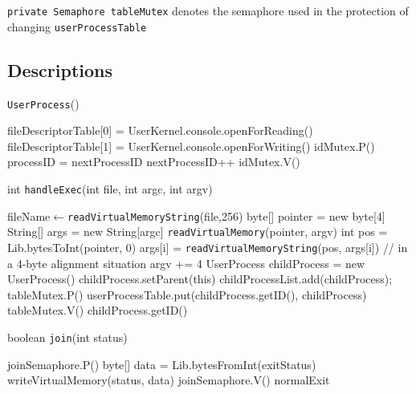\documentclass{article}
\newcommand{\eq}{$\leftarrow$}
\begin{document}
\begin{spacing}{1.1}
\texttt{private Semaphore tableMutex} denotes the semaphore used in the protection of changing \texttt{userProcessTable}
\subsection{Descriptions}
\begin{algorithm}
\caption{\texttt{UserProcess}()}
  \begin{algorithmic}
    \STATE fileDescriptorTable[0] = UserKernel.console.openForReading()
    \STATE fileDescriptorTable[1] = UserKernel.console.openForWriting()
    \STATE \colorbox{myyellow}{idMutex.P()}
	\STATE processID = nextProcessID
	\STATE nextProcessID++
	\STATE \colorbox{myyellow}{idMutex.V()}
  \end{algorithmic}
\end{algorithm}

\begin{algorithm}
\caption{int \texttt{handleExec}(int file, int argc, int argv)}
  \begin{algorithmic}
    \STATE fileName\eq\texttt{readVirtualMemoryString}(file,256)
    \ENDIF
    \ENDIF
      \STATE byte[] pointer = new byte[4]
      \STATE String[] args = new String[argc]
        \STATE \texttt{readVirtualMemory}(pointer, argv)
        \STATE int pos = Lib.bytesToInt(pointer, 0)
        \STATE args[i] = \texttt{readVirtualMemoryString}(pos, args[i])
        \STATE \colorbox{myyellow}{// in a 4-byte alignment situation}
        \STATE argv += 4
        \ENDFOR
    \STATE UserProcess childProcess = new UserProcess()
    \ENDIF
    \STATE childProcess.setParent(this)
    \STATE childProcessList.add(childProcess);
    \STATE \colorbox{myyellow}{tableMutex.P()}
    \STATE userProcessTable.put(childProcess.getID(), childProcess)
    \STATE \colorbox{myyellow}{tableMutex.V()}
    \ENDIF
    \RETURN childProcess.getID()
  \end{algorithmic}
\end{algorithm}

\begin{algorithm}
\caption{boolean \texttt{join}(int status)}
  \begin{algorithmic}
    \STATE joinSemaphore.P()
    \STATE byte[] data = Lib.bytesFromInt(exitStatus)
    \STATE writeVirtualMemory(status, data)
    \STATE joinSemaphore.V()
    \RETURN normalExit
  \end{algorithmic}
\end{algorithm}


\end{spacing}
\end{document}
